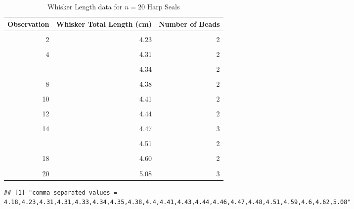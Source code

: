 \documentclass[
]{article}
\begin{document}
\newpage

\begin{table}[H]
\centering\centering
\caption{\label{tab:unnamed-chunk-3}Whisker Length data for $n = 20$ Harp Seals}
\centering
\begin{tabular}[t]{rrr}
\toprule
Observation & Whisker Total Length (cm) & Number of Beads\\
\midrule
\cellcolor{gray!10}{1} & \cellcolor{gray!10}{4.18} & \cellcolor{gray!10}{2}\\
2 & 4.23 & 2\\
\cellcolor{gray!10}{3} & \cellcolor{gray!10}{4.31} & \cellcolor{gray!10}{2}\\
4 & 4.31 & 2\\
\cellcolor{gray!10}{5} & \cellcolor{gray!10}{4.33} & \cellcolor{gray!10}{2}\\
\addlinespace
6 & 4.34 & 2\\
\cellcolor{gray!10}{7} & \cellcolor{gray!10}{4.35} & \cellcolor{gray!10}{2}\\
8 & 4.38 & 2\\
\cellcolor{gray!10}{9} & \cellcolor{gray!10}{4.40} & \cellcolor{gray!10}{2}\\
10 & 4.41 & 2\\
\addlinespace
\cellcolor{gray!10}{11} & \cellcolor{gray!10}{4.43} & \cellcolor{gray!10}{3}\\
12 & 4.44 & 2\\
\cellcolor{gray!10}{13} & \cellcolor{gray!10}{4.46} & \cellcolor{gray!10}{2}\\
14 & 4.47 & 3\\
\cellcolor{gray!10}{15} & \cellcolor{gray!10}{4.48} & \cellcolor{gray!10}{3}\\
\addlinespace
16 & 4.51 & 2\\
\cellcolor{gray!10}{17} & \cellcolor{gray!10}{4.59} & \cellcolor{gray!10}{3}\\
18 & 4.60 & 2\\
\cellcolor{gray!10}{19} & \cellcolor{gray!10}{4.62} & \cellcolor{gray!10}{2}\\
20 & 5.08 & 3\\
\bottomrule
\end{tabular}
\end{table}

\begin{verbatim}
## [1] "comma separated values = 4.18,4.23,4.31,4.31,4.33,4.34,4.35,4.38,4.4,4.41,4.43,4.44,4.46,4.47,4.48,4.51,4.59,4.6,4.62,5.08"
\end{verbatim}
\end{document}
